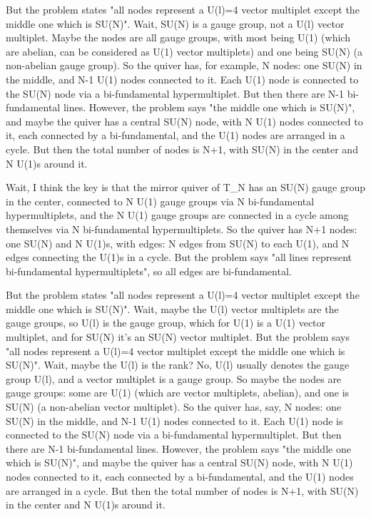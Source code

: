 But the problem states "all nodes represent a U(l)=4 vector multiplet except the middle one which is SU(N)". Wait, SU(N) is a gauge group, not a U(l) vector multiplet. Maybe the nodes are all gauge groups, with most being U(1) (which are abelian, can be considered as U(1) vector multiplets) and one being SU(N) (a non-abelian gauge group). So the quiver has, for example, N nodes: one SU(N) in the middle, and N-1 U(1) nodes connected to it. Each U(1) node is connected to the SU(N) node via a bi-fundamental hypermultiplet. But then there are N-1 bi-fundamental lines. However, the problem says "the middle one which is SU(N)", and maybe the quiver has a central SU(N) node, with N U(1) nodes connected to it, each connected by a bi-fundamental, and the U(1) nodes are arranged in a cycle. But then the total number of nodes is N+1, with SU(N) in the center and N U(1)s around it. 

Wait, I think the key is that the mirror quiver of T_N has an SU(N) gauge group in the center, connected to N U(1) gauge groups via N bi-fundamental hypermultiplets, and the N U(1) gauge groups are connected in a cycle among themselves via N bi-fundamental hypermultiplets. So the quiver has N+1 nodes: one SU(N) and N U(1)s, with edges: N edges from SU(N) to each U(1), and N edges connecting the U(1)s in a cycle. But the problem says "all lines represent bi-fundamental hypermultiplets", so all edges are bi-fundamental. 

But the problem states "all nodes represent a U(l)=4 vector multiplet except the middle one which is SU(N)". Wait, maybe the U(l) vector multiplets are the gauge groups, so U(l) is the gauge group, which for U(1) is a U(1) vector multiplet, and for SU(N) it's an SU(N) vector multiplet. But the problem says "all nodes represent a U(l)=4 vector multiplet except the middle one which is SU(N)". Wait, maybe the U(l) is the rank? No, U(l) usually denotes the gauge group U(l), and a vector multiplet is a gauge group. So maybe the nodes are gauge groups: some are U(1) (which are vector multiplets, abelian), and one is SU(N) (a non-abelian vector multiplet). So the quiver has, say, N nodes: one SU(N) in the middle, and N-1 U(1) nodes connected to it. Each U(1) node is connected to the SU(N) node via a bi-fundamental hypermultiplet. But then there are N-1 bi-fundamental lines. However, the problem says "the middle one which is SU(N)", and maybe the quiver has a central SU(N) node, with N U(1) nodes connected to it, each connected by a bi-fundamental, and the U(1) nodes are arranged in a cycle. But then the total number of nodes is N+1, with SU(N) in the center and N U(1)s around it. 

